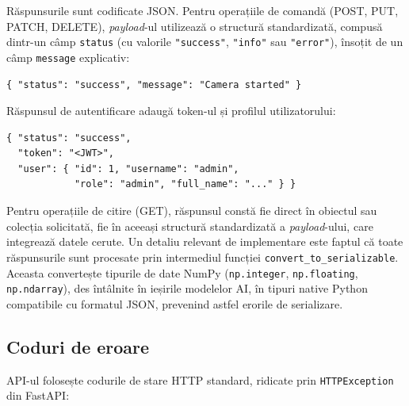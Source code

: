 \documentclass[../../main.tex]{subfiles}
\begin{document}
Răspunsurile sunt codificate JSON. Pentru operațiile de comandă (POST, PUT, \linebreak PATCH, DELETE), \emph{payload}-ul utilizează o structură standardizată, compusă dintr-un câmp \texttt{status} (cu valorile \texttt{"success"}, \texttt{"info"} sau \texttt{"error"}), însoțit de un câmp \texttt{message} explicativ:

\begin{verbatim}
{ "status": "success", "message": "Camera started" }
\end{verbatim}

Răspunsul de autentificare adaugă token-ul și profilul utilizatorului:

\begin{verbatim}
{ "status": "success",
  "token": "<JWT>",
  "user": { "id": 1, "username": "admin",
            "role": "admin", "full_name": "..." } }
\end{verbatim}

Pentru operațiile de citire (GET), răspunsul constă fie direct în obiectul sau colecția solicitată, fie în aceeași structură standardizată a \emph{payload}-ului, care integrează datele cerute. Un detaliu relevant de implementare este faptul că toate răspunsurile sunt procesate prin intermediul funcției \texttt{convert\_to\_serializable}. Aceasta convertește tipurile de date NumPy (\texttt{np.integer}, \texttt{np.floating}, \linebreak \texttt{np.ndarray}), des întâlnite în ieșirile modelelor AI, în tipuri native Python compatibile cu formatul JSON, prevenind astfel erorile de serializare.

\subsection{Coduri de eroare}

API-ul folosește codurile de stare HTTP standard, ridicate prin \texttt{HTTPException} din FastAPI:
\end{document}
